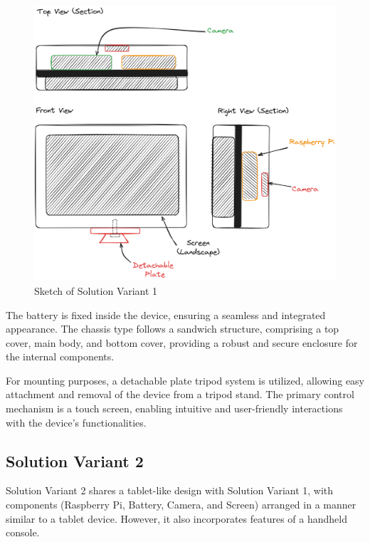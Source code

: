 \begin{figure}[ht!]
    \centering
    \includegraphics[width=\linewidth]{texs/Part1/chapter3/image/v1.png}
    \caption{Sketch of Solution Variant 1}
    \label{fig:sketch-solution-variant-1}
\end{figure}

The battery is fixed inside the device, ensuring a seamless and integrated appearance. The chassis type follows a sandwich structure, comprising a top cover, main body, and bottom cover, providing a robust and secure enclosure for the internal components.

For mounting purposes, a detachable plate tripod system is utilized, allowing easy attachment and removal of the device from a tripod stand. The primary control mechanism is a touch screen, enabling intuitive and user-friendly interactions with the device's functionalities.

\subsection{Solution Variant 2}
Solution Variant 2 shares a tablet-like design with Solution Variant 1, with components (Raspberry Pi, Battery, Camera, and Screen) arranged in a manner similar to a tablet device. However, it also incorporates features of a handheld console.

